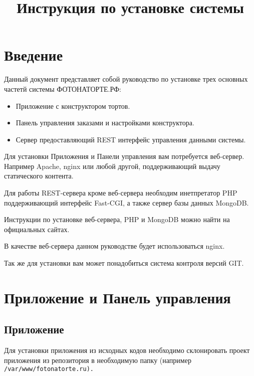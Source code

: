 \documentclass[a4paper,12pt]{report}
\title{{\Huge Инструкция по установке системы}}
\author{\fotocake}
\newcommand{\fotocake}{ФОТОНАТОРТЕ.РФ}
\begin{document}
	\maketitle
	\tableofcontents

	\chapter*{Введение}
	
		Данный документ представляет собой руководство по установке трех основных частетй системы \fotocake:
		
		\begin{itemize}
			\item Приложение с конструктором тортов.			
			\item Панель управления заказами и настройками конструктора.
			\item Сервер предоставляющий REST интерфейс управления данными системы.
		\end{itemize}
		
		Для установки Приложения и Панели управления вам потребуется веб-сервер. Например Apache, nginx или любой другой, поддерживающий выдачу статического контента.
		
		Для работы REST-сервера кроме веб-сервера необходим инетпретатор PHP поддерживающий интерфейс Fast-CGI, а также сервер базы данных MongoDB.
		
		Инструкции по установке веб-сервера, PHP и MongoDB можно найти на официальных сайтах.
		
		В качестве веб-сервера данном руководстве будет использоваться nginx.
		
		Так же для установки вам может понадобиться система контроля версий GIT.
		
	\chapter*{Приложение и Панель управления}
	
		\section*{Приложение}
		
			Для установки приложения из исходных кодов необходимо склонировать проект приложения из репозитория в необходимую папку (например \tt{/var/www/fotonatorte.ru}).
		
\end{document}
